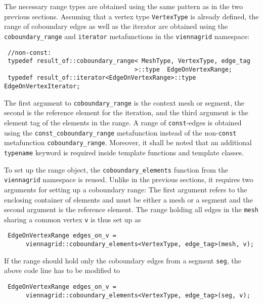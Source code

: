 The necessary range types are obtained using the same pattern as in the two previous sections.
Assuming that a vertex type \lstinline|VertexType| is already defined, the range of coboundary edges as well as the iterator are obtained
using the \lstinline|coboundary_range| and \lstinline|iterator| metafunctions in the \lstinline|viennagrid| namespace:
\begin{lstlisting}
 //non-const:
 typedef result_of::coboundary_range< MeshType, VertexType, edge_tag
                                    >::type  EdgeOnVertexRange;
 typedef result_of::iterator<EdgeOnVertexRange>::type    EdgeOnVertexIterator;
\end{lstlisting}
The first argument to \lstinline|coboundary_range| is the context mesh or segment, the second is the reference element for the iteration, and the third argument is the element tag of the elements in the range.
A range of \lstinline|const|-edges is obtained using the \lstinline|const_coboundary_range| metafunction instead of the non-\lstinline|const| metafunction \lstinline|coboundary_range|.
Moreover, it shall be noted that an additional \lstinline|typename| keyword is required inside template functions and template classes.

To set up the range object, the \lstinline|coboundary_elements| function from the \lstinline|viennagrid| namespace is reused. Unlike in the previous sections, it requires two arguments
for setting up a coboundary range: The first argument refers to the enclosing container of elements and must be either a mesh or a segment and the second argument is the reference element.
The range holding all edges in the \lstinline|mesh| sharing a common vertex \lstinline|v| is thus set up as
\begin{lstlisting}
 EdgeOnVertexRange edges_on_v =
      viennagrid::coboundary_elements<VertexType, edge_tag>(mesh, v);
\end{lstlisting}

If the range should hold only the coboundary edges from a segment \lstinline|seg|, the above code line has to be modified to
\begin{lstlisting}
 EdgeOnVertexRange edges_on_v =
      viennagrid::coboundary_elements<VertexType, edge_tag>(seg, v);
\end{lstlisting}

